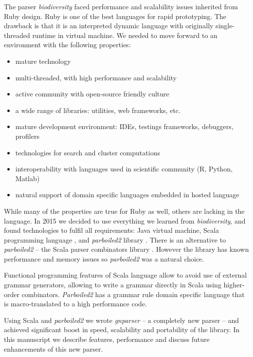 \documentclass{bmcart}
\begin{document}
The parser \textit{biodiversity} faced performance and scalability issues
inherited from Ruby design. Ruby is one of the best languages for rapid
prototyping. The drawback is that it is an interpreted dynamic language with
originally single-threaded runtime in virtual machine. We needed to move
forward to an environment with the following properties:

\begin{itemize}
    \item mature technology
    \item multi-threaded, with high performance and scalability
    \item active community with open-source friendly culture
    \item a wide range of libraries: utilities, web frameworks, etc.
    \item mature development environment: IDEs, testings frameworks,
    debuggers, profilers
    \item technologies for search and cluster computations
    \item interoperability with languages used in scientific community (R,
    Python, Matlab)
    \item natural support of domain specific languages embedded in hosted
    language
\end{itemize}

While many of the properties are true for Ruby as well, others are lacking in
the language. In 2015 we decided to use everything we learned from
\textit{biodiversity}, and found technologies to fulfil all requirements: Java
virtual machine, Scala programming language \cite{odersky2004overview}, and
\textit{parboiled2} library \cite{parboiled2}. There is an alternative to
\textit{parboiled2} -- the Scala parser combinators library
\cite{moors2008parser}. However the library has known performance and memory
issues so \textit{parboiled2} was a natural choice.

Functional programming features of Scala language allow to avoid use of
external grammar generators, allowing to write a grammar directly in Scala
using higher-order combinators. \textit{Parboiled2} has a grammar rule domain
specific language that is macro-translated
\cite{Burmako:2013:SML:2489837.2489840} to a high performance code.

Using Scala and \textit{parboiled2} we wrote \textit{gnparser} -- a
completely new parser -- and achieved significant boost in speed, scalability
and portability of the library. In this manuscript we describe features,
performance and discuss future enhancements of this new parser.
\end{document}
